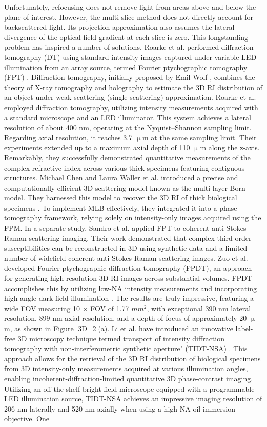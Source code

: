 \documentclass[journal,review,submit,pdftex,moreauthors]{Definitions/mdpi}
\begin{document}
Unfortunately, refocusing does not remove light from areas above and below the plane of interest. However, the multi-slice method does not directly account for backscattered light. Its projection approximation also assumes the lateral divergence of the optical field gradient at each slice is zero. This longstanding problem has inspired a number of solutions. Roarke et al. performed diffraction tomography (DT) using standard intensity images captured under variable LED illumination from an array source, termed Fourier ptychographic tomography (FPT) \cite{horstmeyer2016diffraction}. Diffraction tomography, initially proposed by Emil Wolf \cite{wolf1969three},  combines the theory of X-ray tomography and holography to estimate the 3D RI distribution of an object under weak scattering (single scattering) approximation. Roarke et al. employed diffraction tomography, utilizing intensity measurements acquired with a standard microscope and an LED illuminator. This system achieves a lateral resolution of about 400 nm, operating at the Nyquist–Shannon sampling limit. Regarding axial resolution, it reaches 3.7 $\upmu$m at the same sampling limit. Their experiments extended up to a maximum axial depth of 110 $\upmu$m along the z-axis. Remarkably, they successfully demonstrated quantitative measurements of the complex refractive index across various thick specimens featuring contiguous structures. Michael Chen and Laura Waller et al. introduced a precise and computationally efficient 3D scattering model known as the multi-layer Born model. They harnessed this model to recover the 3D RI of thick biological specimens \cite{chen2020multi}. To implement MLB effectively, they integrated it into a phase tomography framework, relying solely on intensity-only images acquired using the FPM. In a separate study, Sandro et al. applied FPT to coherent anti-Stokes Raman scattering imaging. Their work demonstrated that complex third-order susceptibilities can be reconstructed in 3D using synthetic data and a limited number of widefield coherent anti-Stokes Raman scattering images. Zuo et al. developed Fourier ptychographic diffraction tomography (FPDT), an approach for generating high-resolution 3D RI images across substantial volumes. FPDT accomplishes this by utilizing low-NA intensity measurements and incorporating high-angle dark-field illumination \cite{ zuo2020wide}. The results are truly impressive, featuring a wide FOV measuring 10 × FOV of 1.77 $mm^2$, with exceptional 390 nm lateral resolution, 899 nm axial resolution, and a depth of focus of approximately 20 $\upmu$m, as shown in Figure \ref{3D_2}(a). Li et al. have introduced an innovative label-free 3D microscopy technique termed transport of intensity diffraction tomography with non-interferometric synthetic aperture" (TIDT-NSA) \cite{li2022transport}. This approach allows for the retrieval of the 3D RI distribution of biological specimens from 3D intensity-only measurements acquired at various illumination angles, enabling incoherent-diffraction-limited quantitative 3D phase-contrast imaging. Utilizing an off-the-shelf bright-field microscope equipped with a programmable LED illumination source, TIDT-NSA achieves an impressive imaging resolution of 206 nm laterally and 520 nm axially when using a high NA oil immersion objective. One 
\end{document}
